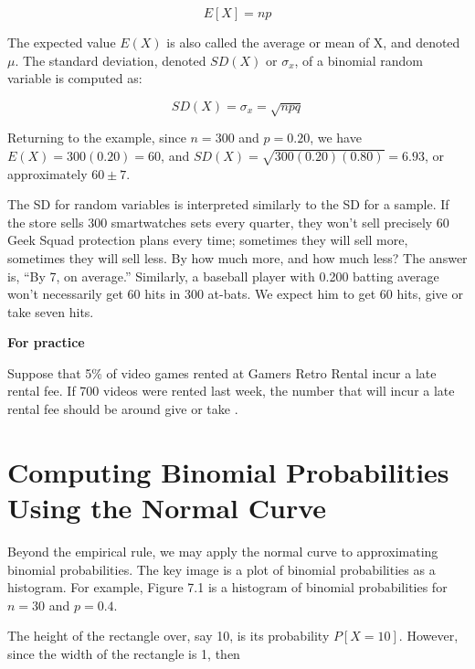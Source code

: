 \documentclass[11pt]{book}\usepackage[]{graphicx}\usepackage[]{color}
\begin{document}
\begin{equation*}
E[ X ] = np
\end{equation*}

The expected value $E(X)$ is also called the average or mean of X, and denoted $\mu$.  The standard deviation, denoted $SD(X)$ or $\sigma_x$, of a binomial random variable is computed as:

\begin{equation*}
SD(X) = \sigma_x = \sqrt{npq}
\end{equation*}

Returning to the example, since $n = 300$ and $p = 0.20$, we have $E(X) = 300(0.20) = 60$, and $SD(X) = \sqrt{300(0.20)(0.80)} = 6.93$, or approximately $60 \pm 7$.

The SD for random variables is interpreted similarly to the SD for a sample.  If the store sells 300 smartwatches sets every quarter, they won't sell precisely 60 Geek Squad protection plans every time; sometimes they will sell more, sometimes they will sell less.   By how much more, and how much less?  The answer is, ``By 7, on average.''   Similarly, a baseball player with 0.200 batting average won't necessarily get 60 hits in 300 at-bats.  We expect him to get 60 hits, give or take seven hits.

\begin{minipage}[ht]{29mm}

\textbf{For practice}
\end{minipage}
\begin{minipage}[ht]{119mm}

Suppose that 5\% of video games rented at Gamers Retro Rental incur a late rental fee. If 700 videos were rented last week, the number that will incur a late rental fee should be around \underline{\phantom{xxxxxxxxxx}} give or take \underline{\phantom{xxxxxxxxxx}}.

\end{minipage}

\section{Computing Binomial Probabilities Using the Normal Curve}

Beyond the empirical rule, we may apply the normal curve to approximating binomial probabilities.  The key image is a plot of binomial probabilities as a histogram.  For example, Figure 7.1 is a histogram of binomial probabilities for $n = 30$ and $p = 0.4$.

The height of the rectangle over, say 10, is its probability $P[X = 10]$.  However, since the width of the rectangle is 1, then
\end{document}
